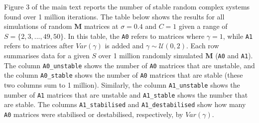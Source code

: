 \documentclass[]{article}
\begin{document}
Figure 3 of the main text reports the number of stable random complex
systems found over 1 million iterations. The table below shows the
results for all simulations of random \(\mathbf{M}\) matrices at
\(\sigma = 0.4\) and \(C = 1\) given a range of
\(S = \{2, 3, ..., 49, 50\}\). In this table, the \texttt{A0} refers to
matrices where \(\gamma = 1\), while \texttt{A1} refers to matrices
after \(Var(\gamma)\) is added and \(\gamma \sim \mathcal{U}(0, 2)\).
Each row summarises data for a given \(S\) over 1 million randomly
simulated \(\mathbf{M}\) (\texttt{A0} and \texttt{A1}). The column
\texttt{A0\_unstable} shows the number of \texttt{A0} matrices that are
unstable, and the column \texttt{A0\_stable} shows the number of
\texttt{A0} matrices that are stable (these two columns sum to 1
million). Similarly, the column \texttt{A1\_unstable} shows the number
of \texttt{A1} matrices that are unstable and \texttt{A1\_stable} shows
the number that are stable. The columns \texttt{A1\_stabilised} and
\texttt{A1\_destabilised} show how many \texttt{A0} matrices were
stabilised or destabilised, respectively, by \(Var(\gamma)\).
\end{document}
